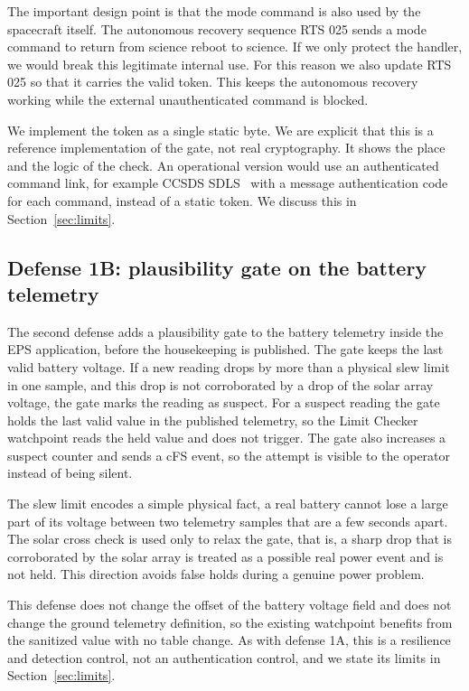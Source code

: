 \documentclass[conference,letterpaper,10pt]{IEEEtran}
\begin{document}
The important design point is that the mode command is also used by the spacecraft itself. The autonomous recovery sequence RTS 025 sends a mode command to return from science reboot to science. If we only protect the handler, we would break this legitimate internal use. For this reason we also update RTS 025 so that it carries the valid token. This keeps the autonomous recovery working while the external unauthenticated command is blocked.

We implement the token as a single static byte. We are explicit that this is a reference implementation of the gate, not real cryptography. It shows the place and the logic of the check. An operational version would use an authenticated command link, for example CCSDS SDLS~\cite{sdls} with a message authentication code for each command, instead of a static token. We discuss this in Section~\ref{sec:limits}.

\subsection{Defense 1B: plausibility gate on the battery telemetry}
The second defense adds a plausibility gate to the battery telemetry inside the EPS application, before the housekeeping is published. The gate keeps the last valid battery voltage. If a new reading drops by more than a physical slew limit in one sample, and this drop is not corroborated by a drop of the solar array voltage, the gate marks the reading as suspect. For a suspect reading the gate holds the last valid value in the published telemetry, so the Limit Checker watchpoint reads the held value and does not trigger. The gate also increases a suspect counter and sends a cFS event, so the attempt is visible to the operator instead of being silent.

The slew limit encodes a simple physical fact, a real battery cannot lose a large part of its voltage between two telemetry samples that are a few seconds apart. The solar cross check is used only to relax the gate, that is, a sharp drop that is corroborated by the solar array is treated as a possible real power event and is not held. This direction avoids false holds during a genuine power problem.

This defense does not change the offset of the battery voltage field and does not change the ground telemetry definition, so the existing watchpoint benefits from the sanitized value with no table change. As with defense 1A, this is a resilience and detection control, not an authentication control, and we state its limits in Section~\ref{sec:limits}.
\end{document}
